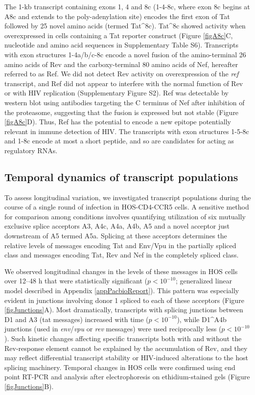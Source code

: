 \documentclass[../sherrill-Mix_thesis.tex]{subfiles}
\begin{document}
The 1-kb transcript containing exons 1, 4 and 8c (1-4-8c, where exon 8c begins at A8c and extends to the poly-adenylation site) encodes the first exon of Tat followed by 25 novel amino acids (termed Tat\^{}8c). Tat\^{}8c showed activity when overexpressed in cells containing a Tat reporter construct (Figure \ref{figA8c}C, nucleotide and amino acid sequences in Supplementary Table S6). Transcripts with exon structures 1-4a/b/c-8c encode a novel fusion of the amino-terminal 26 amino acids of Rev and the carboxy-terminal 80 amino acids of Nef, hereafter referred to as Ref. We did not detect Rev activity on overexpression of the \textit{ref} transcript, and Ref did not appear to interfere with the normal function of Rev or with HIV replication (Supplementary Figure S2). Ref was detectable by western blot using antibodies targeting the C terminus of Nef after inhibition of the proteasome, suggesting that the fusion is expressed but not stable (Figure \ref{figA8c}D). Thus, Ref has the potential to encode a new epitope potentially relevant in immune detection of HIV. The transcripts with exon structures 1-5-8c and 1-8c encode at most a short peptide, and so are candidates for acting as regulatory RNAs.

\subsection{Temporal dynamics of transcript populations}
To assess longitudinal variation, we investigated \hivEight{} transcript populations during the course of a single round of infection in HOS-CD4-CCR5 cells. A sensitive method for comparison among conditions involves quantifying utilization of six mutually exclusive splice acceptors A3, A4c, A4a, A4b, A5 and a novel acceptor just downstream of A5 termed A5a. Splicing at these acceptors determines the relative levels of messages encoding Tat and Env/Vpu in the partially spliced class and messages encoding Tat, Rev and Nef in the completely spliced class.

We observed longitudinal changes in the levels of these messages in HOS cells over 12--48 h that were statistically significant ($p < 10^{-10}$; generalized linear model described in Appendix \ref{appPacbioReport}). This pattern was especially evident in junctions involving donor 1 spliced to each of these acceptors (Figure \ref{figJunctions}A). Most dramatically, transcripts with splicing junctions between D1 and A3 (tat messages) increased with time ($p < 10^{-10}$), while D1\^{}A4b junctions (used in \textit{env}/\textit{vpu} or \textit{rev} messages) were used reciprocally less ($p < 10^{-10}$). Such kinetic changes affecting specific transcripts both with and without the Rev-response element cannot be explained by the accumulation of Rev, and they may reflect differential transcript stability or HIV-induced alterations to the host splicing machinery. Temporal changes in HOS cells were confirmed using end point RT-PCR and analysis after electrophoresis on ethidium-stained gels (Figure \ref{figJunctions}B). 
\end{document}
